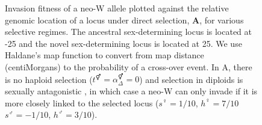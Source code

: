 \documentclass[12pt]{article}
\begin{document}
\begin{figure}[!h]
\centering
\caption{
Invasion fitness of a neo-W allele plotted against the relative genomic location of a locus under direct selection, \textbf{A}, for various selective regimes. 
The ancestral sex-determining locus is located at -25 and the novel sex-determining locus is located at 25. %
We use Haldane's map function \citep[Equation 3 in ][]{Haldane1919} to convert from map distance (centiMorgans) to the probability of a cross-over event. 
In A, there is no haploid selection ($t^\Hermaphrodite=\alpha^\Hermaphrodite_{\Delta}=0$) and selection in diploids is sexually antagonistic \citep[following][]{vanDoorn:2010hu}, in which case a neo-W can only invade if it is more closely linked to the selected locus ($s^\female=1/10$, $h^\female=7/10$ $s^\male=-1/10$, $h^\male=3/10$).
}
\end{figure}
\end{document}
